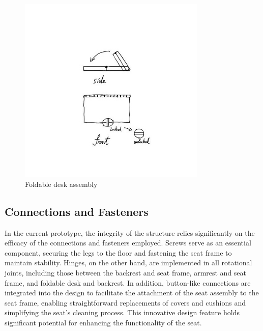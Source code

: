 \begin{figure}[!htp]
    \centering
    \includegraphics[width=0.8\textwidth]{images/desk.jpg}
    \caption{Foldable desk assembly}
    \label{fig:desk-connection}
\end{figure}


\subsection{Connections and Fasteners}
In the current prototype, the integrity of the structure relies significantly on the efficacy of the connections and fasteners employed. Screws serve as an essential component, securing the legs to the floor and fastening the seat frame to maintain stability. Hinges, on the other hand, are implemented in all rotational joints, including those between the backrest and seat frame, armrest and seat frame, and foldable desk and backrest. In addition, button-like connections are integrated into the design to facilitate the attachment of the seat assembly to the seat frame, enabling straightforward replacements of covers and cushions and simplifying the seat's cleaning process. This innovative design feature holds significant potential for enhancing the functionality of the seat.